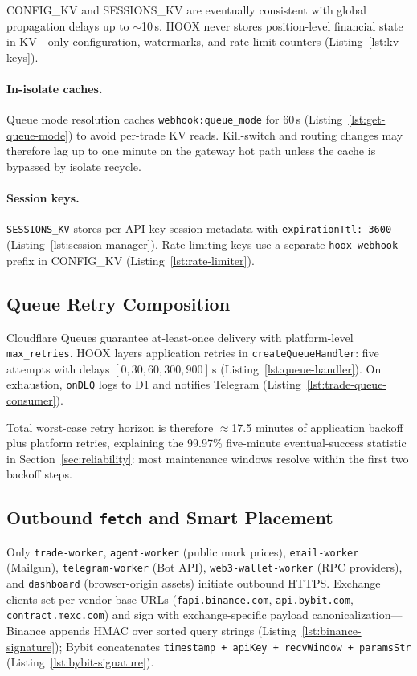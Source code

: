 CONFIG\_KV and SESSIONS\_KV are eventually consistent with global propagation delays up to ${\sim}$10\,s. \textsc{HOOX} never stores position-level financial state in KV---only configuration, watermarks, and rate-limit counters (Listing~\ref{lst:kv-keys}).

\paragraph{In-isolate caches.} Queue mode resolution caches \texttt{webhook:queue\_mode} for 60\,s (Listing~\ref{lst:get-queue-mode}) to avoid per-trade KV reads. Kill-switch and routing changes may therefore lag up to one minute on the gateway hot path unless the cache is bypassed by isolate recycle.

\paragraph{Session keys.} \texttt{SESSIONS\_KV} stores per-API-key session metadata with \texttt{expirationTtl: 3600} (Listing~\ref{lst:session-manager}). Rate limiting keys use a separate \texttt{hoox-webhook} prefix in CONFIG\_KV (Listing~\ref{lst:rate-limiter}).

\subsection{Queue Retry Composition}

Cloudflare Queues guarantee at-least-once delivery with platform-level \texttt{max\_retries}. \textsc{HOOX} layers application retries in \texttt{createQueueHandler}: five attempts with delays $[0, 30, 60, 300, 900]$\,s (Listing~\ref{lst:queue-handler}). On exhaustion, \texttt{onDLQ} logs to D1 and notifies Telegram (Listing~\ref{lst:trade-queue-consumer}).

Total worst-case retry horizon is therefore ${\approx}$17.5 minutes of application backoff plus platform retries, explaining the 99.97\% five-minute eventual-success statistic in Section~\ref{sec:reliability}: most maintenance windows resolve within the first two backoff steps.

\subsection{Outbound \texttt{fetch} and Smart Placement}

Only \texttt{trade-worker}, \texttt{agent-worker} (public mark prices), \texttt{email-worker} (Mailgun), \texttt{telegram-worker} (Bot API), \texttt{web3-wallet-worker} (RPC providers), and \texttt{dashboard} (browser-origin assets) initiate outbound HTTPS. Exchange clients set per-vendor base URLs (\texttt{fapi.binance.com}, \texttt{api.bybit.com}, \texttt{contract.mexc.com}) and sign with exchange-specific payload canonicalization---Binance appends HMAC over sorted query strings (Listing~\ref{lst:binance-signature}); Bybit concatenates \texttt{timestamp + apiKey + recvWindow + paramsStr} (Listing~\ref{lst:bybit-signature}).

